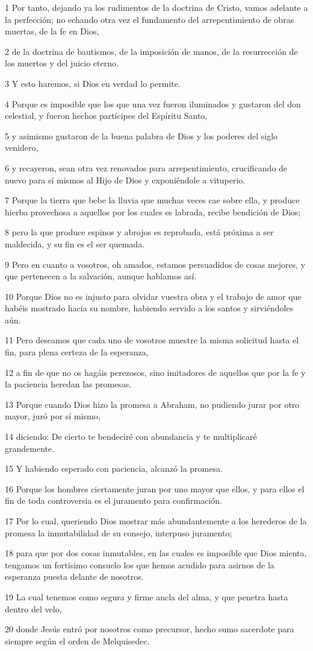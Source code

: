\par 1 Por tanto, dejando ya los rudimentos de la doctrina de Cristo, vamos adelante a la perfección; no echando otra vez el fundamento del arrepentimiento de obras muertas, de la fe en Dios,
\par 2 de la doctrina de bautismos, de la imposición de manos, de la resurrección de los muertos y del juicio eterno.
\par 3 Y esto haremos, si Dios en verdad lo permite.
\par 4 Porque es imposible que los que una vez fueron iluminados y gustaron del don celestial, y fueron hechos partícipes del Espíritu Santo,
\par 5 y asimismo gustaron de la buena palabra de Dios y los poderes del siglo venidero,
\par 6 y recayeron, sean otra vez renovados para arrepentimiento, crucificando de nuevo para sí mismos al Hijo de Dios y exponiéndole a vituperio.
\par 7 Porque la tierra que bebe la lluvia que muchas veces cae sobre ella, y produce hierba provechosa a aquellos por los cuales es labrada, recibe bendición de Dios;
\par 8 pero la que produce espinos y abrojos es reprobada, está próxima a ser maldecida, y su fin es el ser quemada.
\par 9 Pero en cuanto a vosotros, oh amados, estamos persuadidos de cosas mejores, y que pertenecen a la salvación, aunque hablamos así.
\par 10 Porque Dios no es injusto para olvidar vuestra obra y el trabajo de amor que habéis mostrado hacia su nombre, habiendo servido a los santos y sirviéndoles aún.
\par 11 Pero deseamos que cada uno de vosotros muestre la misma solicitud hasta el fin, para plena certeza de la esperanza,
\par 12 a fin de que no os hagáis perezosos, sino imitadores de aquellos que por la fe y la paciencia heredan las promesas.
\par 13 Porque cuando Dios hizo la promesa a Abraham, no pudiendo jurar por otro mayor, juró por sí mismo,
\par 14 diciendo: De cierto te bendeciré con abundancia y te multiplicaré grandemente.
\par 15 Y habiendo esperado con paciencia, alcanzó la promesa.
\par 16 Porque los hombres ciertamente juran por uno mayor que ellos, y para ellos el fin de toda controversia es el juramento para confirmación.
\par 17 Por lo cual, queriendo Dios mostrar más abundantemente a los herederos de la promesa la inmutabilidad de su consejo, interpuso juramento;
\par 18 para que por dos cosas inmutables, en las cuales es imposible que Dios mienta, tengamos un fortísimo consuelo los que hemos acudido para asirnos de la esperanza puesta delante de nosotros.
\par 19 La cual tenemos como segura y firme ancla del alma, y que penetra hasta dentro del velo,
\par 20 donde Jesús entró por nosotros como precursor, hecho sumo sacerdote para siempre según el orden de Melquisedec.

